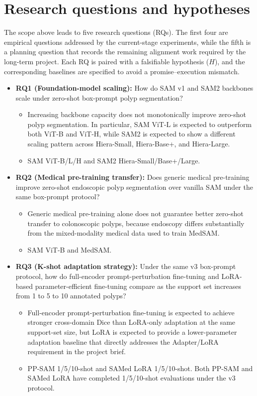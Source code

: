 \section{Research questions and hypotheses}
\label{sec:rq}

The scope above leads to five research questions (RQs). The first four are empirical questions addressed by the current-stage experiments, while the fifth is a planning question that records the remaining alignment work required by the long-term project. Each RQ is paired with a falsifiable hypothesis ($H$), and the corresponding baselines are specified to avoid a promise--execution mismatch.

\begin{itemize}
    \item \textbf{RQ1 (Foundation-model scaling):} How do SAM v1 and SAM2 backbones scale under zero-shot box-prompt polyp segmentation?
    \begin{itemize}
        \item[\textbf{$H_1$:}] Increasing backbone capacity does not monotonically improve zero-shot polyp segmentation. In particular, SAM ViT-L is expected to outperform both ViT-B and ViT-H, while SAM2 is expected to show a different scaling pattern across Hiera-Small, Hiera-Base+, and Hiera-Large.
        \item[\emph{Baselines:}] SAM ViT-B/L/H and SAM2 Hiera-Small/Base+/Large.
    \end{itemize}

    \item \textbf{RQ2 (Medical pre-training transfer):} Does generic medical pre-training improve zero-shot endoscopic polyp segmentation over vanilla SAM under the same box-prompt protocol?
    \begin{itemize}
        \item[\textbf{$H_2$:}] Generic medical pre-training alone does not guarantee better zero-shot transfer to colonoscopic polyps, because endoscopy differs substantially from the mixed-modality medical data used to train MedSAM.
        \item[\emph{Baselines:}] SAM ViT-B and MedSAM.
    \end{itemize}

    \item \textbf{RQ3 (K-shot adaptation strategy):} Under the same v3 box-prompt protocol, how do full-encoder prompt-perturbation fine-tuning and LoRA-based parameter-efficient fine-tuning compare as the support set increases from 1 to 5 to 10 annotated polyps?
    \begin{itemize}
        \item[\textbf{$H_3$:}] Full-encoder prompt-perturbation fine-tuning is expected to achieve stronger cross-domain Dice than LoRA-only adaptation at the same support-set size, but LoRA is expected to provide a lower-parameter adaptation baseline that directly addresses the Adapter/LoRA requirement in the project brief.
        \item[\emph{Baselines:}] PP-SAM 1/5/10-shot and SAMed LoRA 1/5/10-shot. Both PP-SAM and SAMed LoRA have completed 1/5/10-shot evaluations under the v3 protocol.
    \end{itemize}


\end{itemize}
